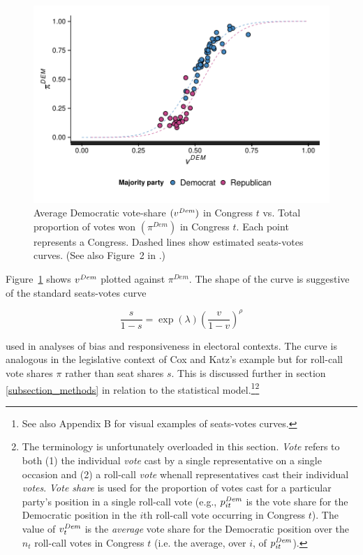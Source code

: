 \begin{figure}
\centering
	\includegraphics[scale=0.75]{sections/figs/vdem_vs_pdem}
\caption{Average Democratic vote-share $(v^{\it Dem})$ in Congress $t$ vs. Total proportion of 
votes won $(\pi^{Dem})$ in Congress $t$. Each point represents a Congress. Dashed lines show 
estimated seats-votes curves. (See also Figure~2 in \protect{}.)}
\label{fig:log_vratio_vs_ptdem}
\end{figure}


Figure~\ref{fig:log_vratio_vs_ptdem} shows $v^{\it Dem}$ plotted against $\pi^{Dem}$. 
The shape of the curve is suggestive of the standard seats-votes curve  

\begin{equation*}
 \frac{s}{1-s} = \exp{(\lambda)}\left(\frac{v}{1-v}\right)^\rho 
\end{equation*}

\noindent used in analyses of bias and responsiveness in electoral contexts. The curve is 
analogous in the legislative context of Cox and Katz's example but for roll-call vote shares 
$\pi$ rather than seat shares $s$. This is discussed further in section \ref{subsection_methods}
in relation to the statistical model.\footnote{See also Appendix B %
for visual examples of seats-votes curves.}\footnote{The terminology is unfortunately overloaded in this 
section. {\it Vote} refers to both (1) the individual {\it vote} cast by a single representative on a 
single occasion and (2) a roll-call {\it vote} whenall representatives cast their individual {\it votes}. 
{\it Vote share} is used for the proportion of votes cast for a particular party's position in a single 
roll-call vote (e.g., $p^{\it Dem}_{it}$ is the vote share for the Democratic position in the $i$th 
roll-call vote occurring in Congress $t$). The value of $v_t^{\it Dem}$ is the {\it average} vote 
share for the Democratic position over the $n_t$ roll-call votes in Congress $t$ (i.e. the average, 
over $i$, of $p^{\it Dem}_{it}$). }  

